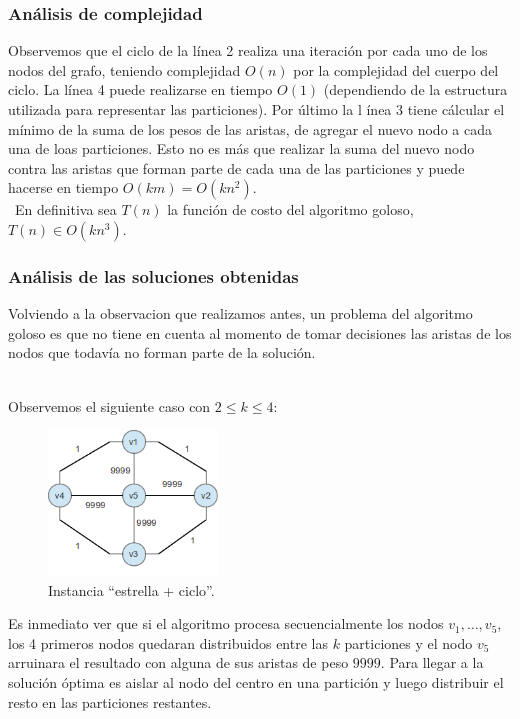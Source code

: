 \subsubsection{An\'alisis de complejidad}
Observemos que el ciclo de la l\'inea 2 realiza una iteraci\'on por cada uno de los nodos del grafo, teniendo complejidad $O(n)$ por la complejidad
del cuerpo del ciclo. La l\'inea 4 puede realizarse en tiempo $O(1)$ (dependiendo de la estructura utilizada para representar las particiones).
Por \'ultimo la l \'inea 3 tiene c\'alcular el m\'inimo de la suma de los pesos de las aristas, de agregar el nuevo nodo a cada una de loas particiones.
Esto no es m\'as que realizar la suma del nuevo nodo contra las aristas que forman parte de cada una de las particiones y puede hacerse en tiempo
$O(km)=O(kn^{2})$. \\\
En definitiva sea $T(n)$ la funci\'on de costo del algoritmo goloso, $T(n) \in O(kn^{3})$.

\subsubsection{An\'alisis de las soluciones obtenidas}
Volviendo a la observacion que realizamos antes, un problema del algoritmo goloso es que no tiene en cuenta al momento de tomar decisiones las aristas
de los nodos que todav\'ia no forman parte de la soluci\'on. \\\

Observemos el siguiente caso con $ 2 \leq k \leq 4$:
\begin{figure}[H]
  \centering
  \includegraphics[width=0.4\textwidth]{ej3/greedy_graph_star+cicle_example1.png}
  \caption{Instancia ``estrella + ciclo''.}
\end{figure}

Es inmediato ver que si el algoritmo procesa secuencialmente los nodos $v_{1}, \ldots ,v_{5}$, los 4 primeros nodos quedaran distribuidos entre las $k$
particiones y el nodo $v_{5}$ arruinara el resultado con alguna de sus aristas de peso $9999$. Para llegar a la soluci\'on \'optima es aislar al
nodo del centro en una partici\'on y luego distribuir el resto en las particiones restantes. 

